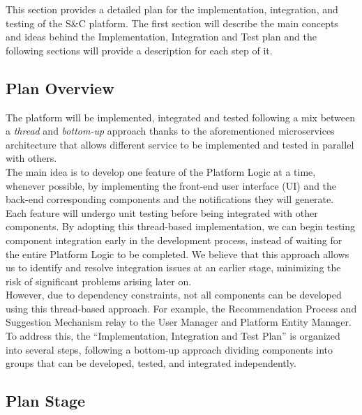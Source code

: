     This section provides a detailed plan for the implementation, integration, and testing of the S\&C platform. The first section will describe the main concepts and ideas behind the Implementation, Integration and Test plan and the following sections will provide a description for each step of it. 
    \subsection{Plan Overview}
    The platform will be implemented, integrated and tested following a mix between a \textit{thread} and \textit{bottom-up} approach thanks to the aforementioned microservices architecture that allows different service to be implemented and tested in parallel with others.\\
    The main idea is to develop one feature of the Platform Logic at a time, whenever possible, by implementing the front-end user interface (UI) and the back-end corresponding components and the notifications they will generate. Each feature will undergo unit testing before being integrated with other components. By adopting this thread-based implementation, we can begin testing component integration early in the development process, instead of waiting for the entire Platform Logic to be completed. We believe that this approach allows us to identify and resolve integration issues at an earlier stage, minimizing the risk of significant problems arising later on.\\
    However, due to dependency constraints, not all components can be developed using this thread-based approach. For example, the Recommendation Process and Suggestion Mechanism relay to the User Manager and Platform Entity Manager. To address this, the “Implementation, Integration and Test Plan” is organized into several steps, following a bottom-up approach dividing components into groups that can be developed, tested, and integrated independently.
    \subsection{Plan Stage}
